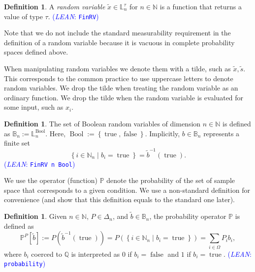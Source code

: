 \documentclass[letterpaper]{article}
\theoremstyle{plain}
\theoremstyle{definition}
\newtheorem{definition}[theorem]{Definition}
\theoremstyle{remark}
\newcommand{\Nats}{\mathbb{N}}
\newcommand{\PP}{\mathbb{P}}
\DeclareMathOperator{\bool}{Bool}
\DeclareMathOperator{\true}{true}
\DeclareMathOperator{\false}{false}
\newcommand{\lean}[1]{\textcolor{blue}{(\emph{LEAN}: \texttt{#1})}}
\newcommand{\leanok}{}
\begin{document}

\begin{definition}
A \emph{random variable} $\tilde{x} \in \mathbb{L}_n^{\tau}$ for $n\in \Nats$ is a function that returns a value of type $\tau$.  
\lean{FinRV} \leanok
\end{definition}
Note that we do not include the standard measurability requirement in the definition of a random variable because it is vacuous in complete probability spaces defined above.

When manipulating random variables we denote them with a tilde, such as $\tilde{x}, \tilde{s}$. This corresponds to the common practice to use uppercase letters to denote random variables. We drop the tilde when treating the random variable as an ordinary function. We drop the tilde when the random variable is evaluated for some input, such as $x_i$.

\begin{definition}
  The set of Boolean random variables of dimension $n\in \Nats$ is defined as $\mathbb{B}_n := \mathbb{L}_n^{\bool}$. Here, $\bool := \left\{ \true, \false \right\}$. Implicitly, $b\in \mathbb{B}_n$ represents a finite set
\[
   \left\{ i\in \Nats_n \mid  b_i = \true \right\} = \tilde{b}^{-1}(\true).
\]
 \lean{FinRV n Bool}
\end{definition}

We use the operator (function) $\mathbb{P}$ denote the probability of the set of sample space that corresponds to a given condition. We use a non-standard definition for convenience (and show that this definition equals to the standard one later).
\begin{definition} \label{def:probability}
Given $n\in \Nats$, $P \in \Delta_n$, and $\tilde{b} \in \mathbb{B}_n$, the probability operator $\PP$ is defined as
\[
\PP^P\left[ \tilde{b} \right] := P(\tilde{b}^{-1}(\true)) = P \left( \left\{ i \in \Nats_n \mid  b_i = \true \right\} \right) = \sum_{i\in \Omega} P_i b_i,
\]
where $b_i$ coerced to $\mathbb{Q}$ is interpreted as $0$ if $b_i = \false$ and $1$ if $b_i = \true$. 
\lean{probability} \leanok
\end{definition}
\end{document}
